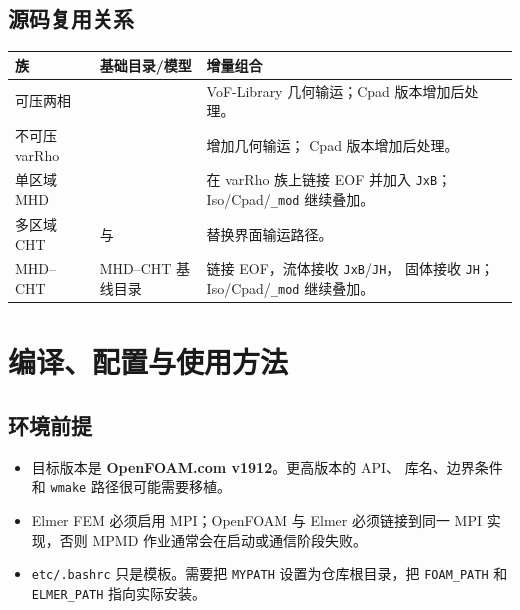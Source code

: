 \documentclass[11pt,a4paper]{article}
\begin{document}
\subsection{源码复用关系}

\begin{longtable}{@{}L{0.23\textwidth}L{0.31\textwidth}L{0.38\textwidth}@{}}
\toprule
\textbf{族} & \textbf{基础目录/模型} & \textbf{增量组合}\\
\midrule
\endhead
可压两相 &
 &
VoF-Library 几何输运；Cpad 版本增加后处理。\\
不可压 varRho &
 &
 增加几何输运；
Cpad 版本增加后处理。\\
单区域 MHD &
 &
在 varRho 族上链接 EOF 并加入 \texttt{JxB}；
Iso/Cpad/\texttt{\_mod} 继续叠加。\\
多区域 CHT &
 与
 &
 替换界面输运路径。\\
MHD--CHT &
MHD--CHT 基线目录 &
链接 EOF，流体接收 \texttt{JxB}/\texttt{JH}，
固体接收 \texttt{JH}；Iso/Cpad/\texttt{\_mod} 继续叠加。\\
\bottomrule
\end{longtable}

\section{编译、配置与使用方法}

\subsection{环境前提}

\begin{itemize}
    \item 目标版本是 \textbf{OpenFOAM.com v1912}。更高版本的 API、
    库名、边界条件和 \texttt{wmake} 路径很可能需要移植。
    \item Elmer FEM 必须启用 MPI；OpenFOAM 与 Elmer 必须链接到同一
    MPI 实现，否则 MPMD 作业通常会在启动或通信阶段失败。
    \item \texttt{etc/.bashrc} 只是模板。需要把 \texttt{MYPATH}
    设置为仓库根目录，把 \texttt{FOAM\_PATH} 和 \texttt{ELMER\_PATH}
    指向实际安装。
\end{itemize}
\end{document}
